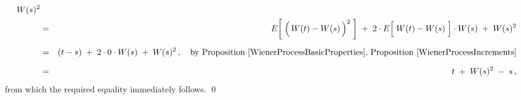 \begin{enumerate}
\begin{eqnarray*}
		W(s)^{2}
	\\
	& \overset{{\color{white}\textnormal{\large$1$}}}{=} &
		E\!\left[\; \left(\,W(t) \overset{{\color{white}.}}{-} W(s)\,\right)^{2} \;\right]
		\; + \;
		2 \cdot E\!\left[\; W(t) \overset{{\color{white}.}}{-} W(s) \;\right] \cdot W(s)
		\; + \;
		W(s)^{2}
	\\
	& \overset{{\color{white}\textnormal{\large$1$}}}{=} &
		(t-s)
		\; + \;
		2 \cdot 0 \cdot W(s)
		\; + \;
		W(s)^{2}\,,
		\quad
		\textnormal{by Proposition \ref{WienerProcessBasicProperties}, Proposition \ref{WienerProcessIncrements}}
	\\
	& \overset{{\color{white}\textnormal{\large$1$}}}{=} &
		t \; + \; W(s)^{2} \; - \; s\,,
	\end{eqnarray*}
	from which the required equality immediately follows.
	\qed
\end{enumerate}


